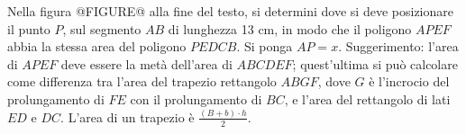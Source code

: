 Nella figura @FIGURE@ alla fine del testo,
si determini dove si deve posizionare il punto $P$, 
sul segmento $AB$ di lunghezza 13 cm, in modo che 
il poligono $APEF$ abbia la stessa area del poligono $PEDCB$.
Si ponga $AP=x$. 
Suggerimento: l'area di $APEF$ deve essere la met\`a 
dell'area di $ABCDEF$; quest'ultima si pu\`o calcolare 
come differenza tra l'area del trapezio rettangolo $ABGF$, 
dove $G$ \`e l'incrocio del prolungamento di $FE$ con il 
prolungamento di $BC$, e l'area del rettangolo di lati 
$ED$ e $DC$. L'area di un trapezio \`e $\frac{(B + b)\cdot h}{2}$.